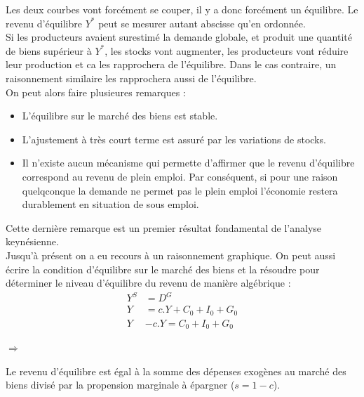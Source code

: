 \documentclass[10pt]{book}
\begin{document}
Les deux courbes vont forcément se couper, il y a donc forcément un équilibre. Le revenu d'équilibre $Y^*$ peut se mesurer autant abscisse qu'en ordonnée. \\
Si les producteurs avaient surestimé la demande globale, et produit une quantité de biens supérieur à $Y^*$, les stocks vont augmenter, les producteurs vont réduire leur production et ca les rapprochera de l'équilibre. Dans le cas contraire, un raisonnement similaire les rapprochera aussi de l'équilibre. \\
On peut alors faire plusieures remarques : 
\begin{itemize}
  \item L'équilibre sur le marché des biens est stable.
  \item L'ajustement à très court terme est assuré par les variations de stocks.
  \item Il n'existe aucun mécanisme qui permette d'affirmer que le revenu d'équilibre correspond au revenu de plein emploi. Par conséquent, si pour une raison quelqconque la demande ne permet pas le plein emploi l'économie restera durablement en situation de sous emploi.
\end{itemize}
Cette dernière remarque est un premier résultat fondamental de l'analyse keynésienne. \\
Jusqu'à présent on a eu recours à un raisonnement graphique. On peut aussi écrire la condition d'équilibre sur le marché des biens et la résoudre pour déterminer le niveau d'équilibre du revenu de manière algébrique : 
\begin{align*}
  Y^S & = D^G \\
  Y & = c.Y + C_0 + I_0 + G_0 \\
  Y & - c.Y = C_0 + I_0 + G_0 
\end{align*}
\begin{center}
  $\Rightarrow$ 
\end{center}
Le revenu d'équilibre est égal à la somme des dépenses exogènes au marché des biens divisé par la propension marginale à épargner ($s = 1 - c$).
\end{document}
